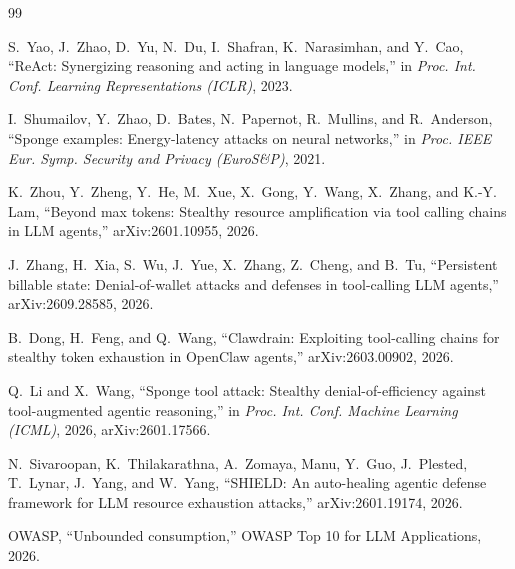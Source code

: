 \documentclass[conference]{IEEEtran}
\begin{document}
\begin{thebibliography}{99}

S.~Yao, J.~Zhao, D.~Yu, N.~Du, I.~Shafran, K.~Narasimhan, and Y.~Cao,
``ReAct: Synergizing reasoning and acting in language models,''
in \emph{Proc. Int. Conf. Learning Representations (ICLR)}, 2023.

I.~Shumailov, Y.~Zhao, D.~Bates, N.~Papernot, R.~Mullins, and R.~Anderson,
``Sponge examples: Energy-latency attacks on neural networks,''
in \emph{Proc. IEEE Eur. Symp. Security and Privacy (EuroS\&P)}, 2021.

K.~Zhou, Y.~Zheng, Y.~He, M.~Xue, X.~Gong, Y.~Wang, X.~Zhang, and K.-Y. Lam,
``Beyond max tokens: Stealthy resource amplification via tool calling chains in
LLM agents,'' arXiv:2601.10955, 2026.

J.~Zhang, H.~Xia, S.~Wu, J.~Yue, X.~Zhang, Z.~Cheng, and B.~Tu,
``Persistent billable state: Denial-of-wallet attacks and defenses in
tool-calling LLM agents,'' arXiv:2609.28585, 2026.

B.~Dong, H.~Feng, and Q.~Wang,
``Clawdrain: Exploiting tool-calling chains for stealthy token exhaustion in
OpenClaw agents,'' arXiv:2603.00902, 2026.

Q.~Li and X.~Wang,
``Sponge tool attack: Stealthy denial-of-efficiency against tool-augmented
agentic reasoning,'' in \emph{Proc. Int. Conf. Machine Learning (ICML)}, 2026,
arXiv:2601.17566.

N.~Sivaroopan, K.~Thilakarathna, A.~Zomaya, Manu, Y.~Guo, J.~Plested, T.~Lynar,
J.~Yang, and W.~Yang,
``SHIELD: An auto-healing agentic defense framework for LLM resource exhaustion
attacks,'' arXiv:2601.19174, 2026.

OWASP, ``Unbounded consumption,'' OWASP Top 10 for LLM Applications, 2026.

\end{thebibliography}
\end{document}

